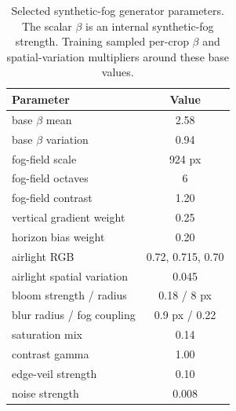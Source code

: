 \documentclass[9pt]{osa-supplemental-document}
\begin{document}
\begin{table}[htbp]
\centering
\scriptsize
\caption{Selected synthetic-fog generator parameters. The scalar $\beta$ is an internal synthetic-fog strength. Training sampled per-crop $\beta$ and spatial-variation multipliers around these base values.}
\label{tabS:spatial_synth_params}
\begin{tabular}{lc}
\toprule
\textbf{Parameter} & \textbf{Value} \\
\midrule
base $\beta$ mean & 2.58 \\
base $\beta$ variation & 0.94 \\
fog-field scale & 924 px \\
fog-field octaves & 6 \\
fog-field contrast & 1.20 \\
vertical gradient weight & 0.25 \\
horizon bias weight & 0.20 \\
airlight RGB & 0.72, 0.715, 0.70 \\
airlight spatial variation & 0.045 \\
bloom strength / radius & 0.18 / 8 px \\
blur radius / fog coupling & 0.9 px / 0.22 \\
saturation mix & 0.14 \\
contrast gamma & 1.00 \\
edge-veil strength & 0.10 \\
noise strength & 0.008 \\
\bottomrule
\end{tabular}
\end{table}
\end{document}
